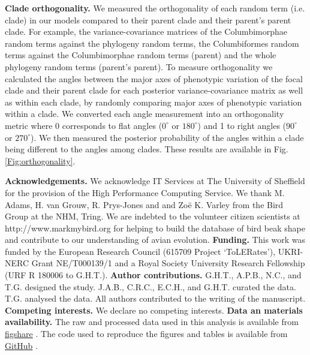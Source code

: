 \documentclass[12pt,letterpaper]{article}
\begin{document}
\textbf{Clade orthogonality.}
We measured the orthogonality of each random term (i.e. clade) in our models compared to their parent clade and their parent's parent clade.
For example, the variance-covariance matrices of the Columbimorphae random terms against the phylogeny random terms, the Columbiformes random terms against the Columbimorphae random terms (parent) and the whole phylogeny random terms (parent's parent).
To measure orthogonality we calculated the angles between the major axes of phenotypic variation of the focal clade and their parent clade for each posterior variance-covariance matrix as well as within each clade, by randomly comparing major axes of phenotypic variation within a clade.
We converted each angle measurement into an orthogonality metric where 0 corresponds to flat angles ($0^\circ$ or  $180^\circ$) and 1 to right angles ($90^\circ$ or $270^\circ$).
We then measured the posterior probability of the angles within a clade being different to the angles among clades.
These results are available in Fig. \ref{Fig:orthogonality}.







\textbf{Acknowledgements.}
We acknowledge IT Services at The University of Sheffield for the provision of the High Performance Computing Service.
We thank M. Adams, H. van Grouw, R. Prys-Jones and and Zo\"{e} K. Varley from the Bird Group at the NHM, Tring.
We are indebted to the volunteer citizen scientists at http://www.markmybird.org for helping to build the database of bird beak shape and contribute to our understanding of avian evolution. 
\textbf{Funding.}
This work was funded by the European Research Council (615709 Project ‘ToLERates’), UKRI-NERC Grant NE/T000139/1 and a Royal Society University Research Fellowship (URF R 180006 to G.H.T.).
\textbf{Author contributions.}
G.H.T., A.P.B., N.C., and T.G. designed the study. J.A.B., C.R.C., E.C.H., and G.H.T. %
curated the data. T.G. analysed the data. All authors contributed to the writing of the manuscript.
\textbf{Competing interests.}
We declare no competing interests.
\textbf{Data an materials availability.}
The raw and processed data used in this analysis is available from \href{https://figshare.shef.ac.uk/account/articles/21526146}{figshare} \cite{fighsaredata}.
The code used to reproduce the figures and tables is available from \href{https://github.com/TGuillerme/elaboration_exploration_bird_beaks}{GitHub} \cite{githubrepo}.

\end{document}
